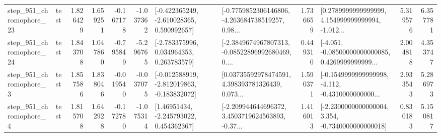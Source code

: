 \begin{tabular}{llrrrrllrlrr}
  step\_951\_chromophore\_23 &      test &      1.826429 &    1.659251 &     -0.167178 & -1.037362 &   [-0.422365249, -2.610028365, 0.590992657] &  [-0.7759852306146806, -4.263684738519257, 0.98... &       1.736659 &  [0.2789999999999999, 4.154999999999994, -1.012... &            5.319576 &          6.357781 \\
  step\_951\_chromophore\_24 &      test &      1.843708 &    1.047860 &     -0.795849 & -5.296765 &    [-2.783375996, 0.034964353, 0.263783579] &  [-2.3849674967807313, -0.08522896992680469, 0.... &       0.449310 &  [-4.051, -0.08500000000000085, 0.4269999999999... &            2.004818 &          4.353747 \\
   step\_951\_chromophore\_3 &      test &      1.857586 &    1.838046 &     -0.019540 & -0.037075 &  [-0.012588919, -2.812019863, -0.183832072] &  [0.03735592978474591, 4.398393781326439, 0.073... &       1.590371 &  [-0.1549999999999998, -4.112, -0.4310000000000... &            2.933543 &          5.286973 \\
   step\_951\_chromophore\_4 &      test &      1.815708 &    1.642928 &     -0.172780 & -1.075314 &     [1.46951434, -2.245793022, 0.454362367] &  [-2.209944644696372, 3.4503719624563893, -0.37... &       1.416013 &  [-2.2300000000000004, 3.354, -0.7340000000000018] &            0.830183 &          5.150817 \\
\bottomrule
\end{tabular}

